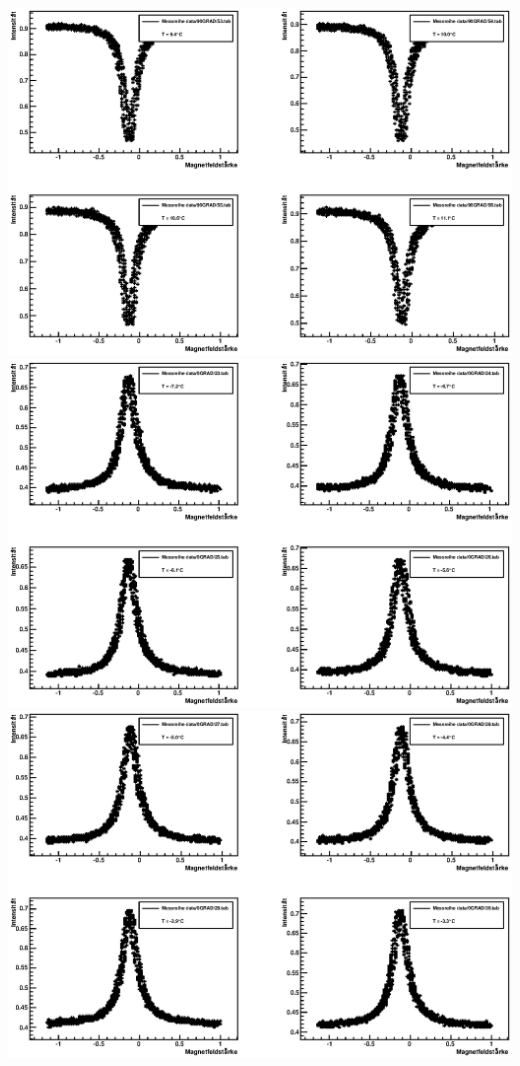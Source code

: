 \documentclass[12pt]{article}
\begin{document}
\includegraphics[width=1\linewidth]{pictures/10.eps} \\
\includegraphics[width=1\linewidth]{pictures/11.eps} \\
\includegraphics[width=1\linewidth]{pictures/12.eps} \\
\end{document}
